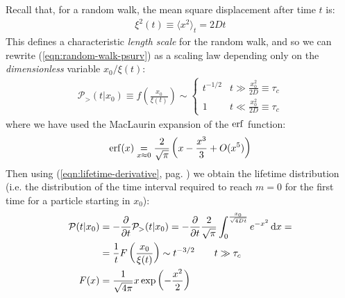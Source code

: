 \documentclass[../../main.tex]{subfiles}
\begin{document}
\begin{enumerate}
    Recall that, for a random walk, the mean square displacement after time $t$ is:
    \begin{align*}
        \xi^2(t) \equiv \langle x^2 \rangle_t = 2Dt
    \end{align*}
    This defines a characteristic \textit{length scale} for the random walk, and so we can rewrite (\ref{eqn:random-walk-psurv}) as a scaling law depending only on the \textit{dimensionless} variable $x_0/\xi(t)$:
    \begin{align*}
        \mathcal{P}_{>}(t|x_0) \equiv f\left(\frac{x_0}{\xi(t)} \right) \sim \begin{cases}
            t^{-1/2} & t \gg \frac{x_0^2}{2 D} \equiv \tau_c\\
            1 & t \ll \frac{x_0^2}{2D} \equiv \tau_c  
        \end{cases}
    \end{align*} 
    where we have used the MacLaurin expansion of the $\erf$ function:
    \begin{align*}
        \erf(x) \underset{x\approx 0}{=}  \frac{2}{\sqrt{\pi}} \left(x - \frac{x^3}{3} + O(x^5) \right) 
    \end{align*}
    Then using (\ref{eqn:lifetime-derivative}, pag. \pageref{eqn:lifetime-derivative}) we obtain the lifetime distribution (i.e. the distribution of the time interval required to reach $m=0$ for the first time for a particle starting in $x_0$):
    \begin{align*}
        \mathcal{P}(t|x_0) &= - \pdv{t} \mathcal{P}_> (t|x_0) = -\pdv{t} \frac{2}{\sqrt{\pi}} \int_0^{\frac{x_0}{\sqrt{4 D t}} } e^{-x^2} \dd{x} =\\
        &= \frac{1}{t} F\left(\frac{x_0}{\xi(t)} \right) \sim t^{-3/2} \qquad t \gg \tau_c\\
        F(x) &= \frac{1}{\sqrt{4 \pi}} x \exp\left(-\frac{x^2}{2} \right)
    \end{align*}
\end{enumerate}
\end{document}

